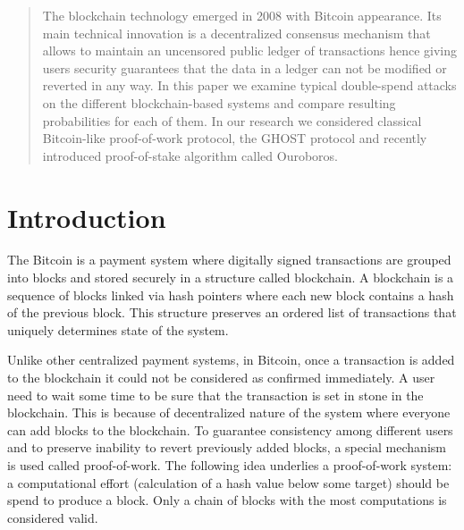 \documentclass[10pt,a4paper]{article}
\numberwithin{equation}{section} %
\theoremstyle{plain}
\theoremstyle{definition}
\theoremstyle{remark}
\begin{document}
	
	
	
	\begin{abstract}
	The blockchain technology emerged in 2008 with Bitcoin appearance. Its main technical innovation is a decentralized consensus mechanism that allows to maintain an uncensored public ledger of transactions hence giving users security guarantees that the data in a ledger can not be modified or reverted in any way. In this paper we examine typical double-spend attacks on the different blockchain-based systems and compare resulting probabilities for each of them. In our research we considered classical Bitcoin-like proof-of-work protocol, the GHOST protocol and recently introduced proof-of-stake algorithm called Ouroboros.
	\end{abstract}
	
	
	\begin{flushleft}
		\eject 
		
	\end{flushleft}
	
	
	\tableofcontents
	
	\begin{flushleft}
		\eject 
		
	\end{flushleft}
	
	\section{Introduction}
	The Bitcoin is a payment system where digitally signed transactions are grouped into blocks and stored securely in a structure called blockchain. A blockchain is a sequence of blocks linked via hash pointers where each new block contains a hash of the previous block. This structure preserves an ordered list of transactions that uniquely determines state of the system.
	
	Unlike other centralized payment systems, in Bitcoin, once a transaction is added to the blockchain it could not be considered as confirmed immediately. A user need to wait some time to be sure that the transaction is set in stone in the blockchain. This is because of decentralized nature of the system where everyone can add blocks to the blockchain. To guarantee consistency among different users and to preserve inability to revert previously added blocks, a special mechanism is used called proof-of-work. The following idea underlies a proof-of-work system: a computational effort (calculation of a hash value below some target) should be spend to produce a block. Only a chain of blocks with the most computations is considered valid.
	
\end{document}
